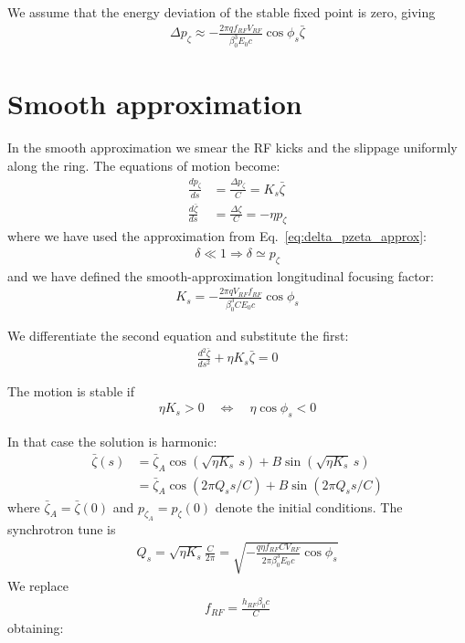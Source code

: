 We assume that the energy deviation of the stable fixed point is zero, giving
\begin{align}
\Delta {p}_\zeta \approx -\frac{2\pi q f_{RF} V_{RF}}{\beta_0^3 E_0 c}\cos{\phi_s}\bar{\zeta}
\label{eq:deltapzeta}
\end{align}





\section{Smooth approximation}

In the smooth approximation we smear the RF kicks and the slippage uniformly along the ring. The equations of motion become:
\begin{align}
\frac{dp_\zeta}{d s} &= \frac{\Delta {p}_\zeta}{C}
=K_s \bar{\zeta}
\\
\frac{d\bar{\zeta}}{d s} &= \frac{\Delta \zeta}{C} = -\eta p_\zeta
\label{eg:dzeta_ds}
\end{align}
where we have used the approximation from Eq.~\ref{eq:delta_pzeta_approx}:
\begin{align}
\delta \ll 1  \Rightarrow \delta \simeq p_\zeta
\end{align}
and we have defined the smooth-approximation longitudinal focusing factor:
\begin{align}
K_s = -\frac{2\pi q V_{RF} f_{RF}}{\beta_0^3 C E_0 c}\cos{\phi_s}
\end{align}

We differentiate the second equation and substitute the first:
\begin{align}
\frac{d^2\bar{\zeta}}{d s^2}  +  \eta K_s \bar{\zeta} = 0
\end{align}

The motion is stable if
\begin{align}
\eta K_s > 0 \quad \Leftrightarrow \quad \eta \cos{\phi_s} < 0
\end{align}

In that case the solution is harmonic:
\begin{align}
\bar{\zeta}(s) &= \bar{\zeta}_A \cos\left( \sqrt{ \eta K_s}\, s\right) + B \sin\left( \sqrt{ \eta K_s}\, s \right) \nonumber\\
               &= \bar{\zeta}_A \cos\left( 2 \pi Q_s s/C\right) + B \sin\left( 2 \pi Q_s s/C \right)
\label{eq:zetasolution_B}
\end{align}
where $\bar{\zeta}_A = \bar{\zeta}(0)$ and $p_{\zeta_A} = p_\zeta(0)$ denote the initial conditions. The synchrotron tune is
\begin{align}
Q_s = \sqrt{ \eta K_s} \frac{C}{2\pi}
= \sqrt{-  \frac{ q \eta f_{RF} C V_{RF}}{2\pi\beta_0^3 E_0 c}\cos{\phi_s}}
\end{align}
We replace
\begin{align}
f_{RF} =
\frac{h_{RF} {\beta_0 c}}{C}
\end{align}
obtaining:

